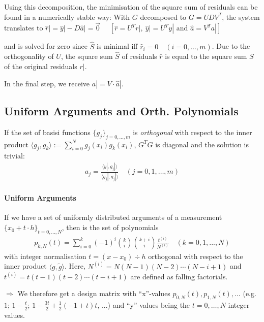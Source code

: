 Using this decomposition, the minimisation of the square sum of residuals can be found in a numerically stable way:
With $G$ decomposed to $G=UDV^T$, the system translates to
\colorbox{shadecolor}{
	$\hat{r}| = \hat{y}| - D\hat{a}| = \vec{0}\quad$
	{\color{darkgray} $\left[\hat{r} = U^Tr|,\ \hat{y}| = U^Ty|\text{ and }\hat{a} = V^Ta|\right]$}
}

and is solved for zero since $\hat{S}$ is minimal iff $\hat{r}_i=0\quad(i=0,\ldots,m)$.
Due to the orthogonality of $U$, the square sum $\hat{S}$ of residuals $\hat{r}$ is equal to the square sum $S$ of the original
residuals $r|$.

In the final step, we receive $a| = V\cdot\hat{a}|$.

\subsection{Uniform Arguments and Orth. Polynomials}

If the set of basisi functions $\{g_j\}_{j=0,\ldots,m}$ is \emph{orthogonal} with respect to the inner product
$\langle g_j,g_k\rangle := \sum_{i=0}^N g_j(x_i)g_k(x_i)$, $G^TG$ is diagonal and the solution is trivial:
\begin{align*}
	a_j=\frac{\langle y|, g_j|\rangle}{\langle g_j|, g_j|\rangle}\quad(j=0,1,\ldots,m)
\end{align*}

\paragraph{Uniform Arguments}
If we have a set of uniformly distributed arguments of a measurement $\{x_0 + t\cdot h\}_{t=0,\ldots,N}$,
then is the set of polynomials
\begin{align*}
	p_{k,N}(t) 
	= \sum_{i=0}^{k}(-1)^{i}{\binom{k}{i}}{\binom{k+i}{i}}{\frac{t^{(i)}}{N^{(i)}}}\quad(k=0,1,...,N)
\end{align*}
with integer normalisation $t = (x-x_0)\div h$ orthogonal with respect to the inner product $\langle g,\tilde{g}\rangle$.
Here, $N^{(i)} = N(N-1)(N-2)\cdots(N-i+1)$ and $t^{(i)} = t(t-1)(t-2)\cdots(t-i+1)$ are defined as falling factorials.

$\Rightarrow$ We therefore get a design matrix with ``x''-values $p_{0,N}(t), p_{1,N}(t),\ldots$
(e.g. $1$; $1-\frac{t}{2}$; $1-\frac{3t}{2}+\frac{1}{2}(-1+t)t$, ...) and ``y''-values being the $t=0,\ldots,N$ integer values.
